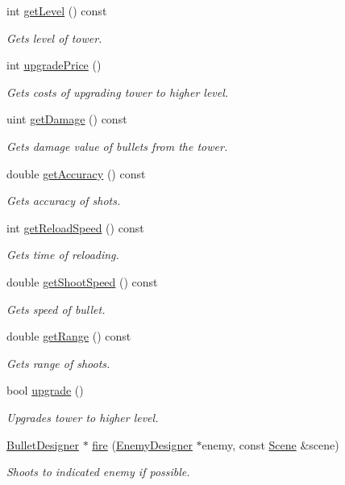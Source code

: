 \begin{DoxyCompactItemize}
int \mbox{\hyperlink{class_tower_a4a69796c3c65aeae2d42ef631d69eb6c}{get\+Level}} () const
\begin{DoxyCompactList}\small\item\em Gets level of tower. \end{DoxyCompactList}\item 
int \mbox{\hyperlink{class_tower_a90246de79aad5204b3c9ecd8aafec6e9}{upgrade\+Price}} ()
\begin{DoxyCompactList}\small\item\em Gets costs of upgrading tower to higher level. \end{DoxyCompactList}\item 
uint \mbox{\hyperlink{class_tower_a52b934c8b84d0fd9e5d8fbd49f01a5ad}{get\+Damage}} () const
\begin{DoxyCompactList}\small\item\em Gets damage value of bullets from the tower. \end{DoxyCompactList}\item 
double \mbox{\hyperlink{class_tower_a038998e96c97ef8fcdbc5005b6429f21}{get\+Accuracy}} () const
\begin{DoxyCompactList}\small\item\em Gets accuracy of shots. \end{DoxyCompactList}\item 
int \mbox{\hyperlink{class_tower_a7712ef687630f1831073934629ddc984}{get\+Reload\+Speed}} () const
\begin{DoxyCompactList}\small\item\em Gets time of reloading. \end{DoxyCompactList}\item 
double \mbox{\hyperlink{class_tower_a3e24b34760dbcc22a98cb0526ff85ad9}{get\+Shoot\+Speed}} () const
\begin{DoxyCompactList}\small\item\em Gets speed of bullet. \end{DoxyCompactList}\item 
double \mbox{\hyperlink{class_tower_a703e8dff95cd8995db19479703dfc353}{get\+Range}} () const
\begin{DoxyCompactList}\small\item\em Gets range of shoots. \end{DoxyCompactList}\item 
bool \mbox{\hyperlink{class_tower_a831ac6bf0ec549c6e5296bcc16fa1a00}{upgrade}} ()
\begin{DoxyCompactList}\small\item\em Upgrades tower to higher level. \end{DoxyCompactList}\item 
\mbox{\hyperlink{class_bullet_designer}{Bullet\+Designer}} $\ast$ \mbox{\hyperlink{class_tower_a7bc66cc3d7b33c82894e186c5088d849}{fire}} (\mbox{\hyperlink{class_enemy_designer}{Enemy\+Designer}} $\ast$enemy, const \mbox{\hyperlink{class_scene}{Scene}} \&scene)
\begin{DoxyCompactList}\small\item\em Shoots to indicated enemy if possible. \end{DoxyCompactList}\end{DoxyCompactItemize}
